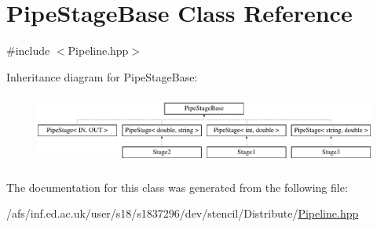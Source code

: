 \hypertarget{classPipeStageBase}{\section{Pipe\-Stage\-Base Class Reference}
\label{classPipeStageBase}
}


{\ttfamily \#include $<$Pipeline.\-hpp$>$}

Inheritance diagram for Pipe\-Stage\-Base\-:\begin{figure}[H]
\begin{center}
\leavevmode
\includegraphics[height=2.346369cm]{classPipeStageBase}
\end{center}
\end{figure}


The documentation for this class was generated from the following file\-:\begin{DoxyCompactItemize}
\item 
/afs/inf.\-ed.\-ac.\-uk/user/s18/s1837296/dev/stencil/\-Distribute/\hyperlink{Pipeline_8hpp}{Pipeline.\-hpp}\end{DoxyCompactItemize}
